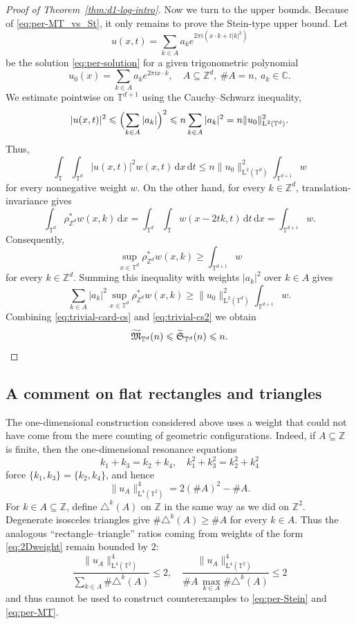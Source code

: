 \documentclass[11pt,reqno]{amsart}
\numberwithin{equation}{section}
\newcommand{\dd}{\,\mathrm{d}}
\renewcommand{\leq}{\leqslant}
\renewcommand{\geq}{\geqslant}
\renewcommand{\ge}{\geqslant}
\begin{document}
\begin{proof}[Proof of Theorem~\ref{thm:d1-log-intro}]
Now we turn to the upper bounds. Because of \eqref{eq:per-MT_vs_St}, it only remains to prove the Stein-type upper bound. 
Let
\[ u(x,t) = \sum_{k\in A} a_k e^{2\pi i (x\cdot k + t|k|^2)} \]
be the solution \eqref{eq:per-solution} for a given trigonometric polynomial
\[ u_0(x) = \sum_{k\in A} a_k e^{2\pi i x\cdot k},\quad A\subseteq\mathbb{Z}^d,\ \#A=n,\ a_k\in\mathbb{C}. \]
We estimate pointwise on $\mathbb{T}^{d+1}$ using the Cauchy--Schwarz inequality,
\[ |u(x,t)|^2 \leq \Bigl(\sum_{k\in A}|a_k|\Bigr)^2
\leq n\sum_{k\in A}|a_k|^2
= n\|u_0\|_{\mathrm{L}^2(\mathbb{T}^d)}^2. \]
Thus,
\begin{equation}\label{eq:trivial-card-cs}
\int_{\mathbb{T}} \int_{\mathbb{T}^d} |u(x,t)|^2w(x,t)\dd x\dd t \leq n\|u_0\|_{\mathrm{L}^2(\mathbb{T}^d)}^2 \int_{\mathbb{T}^{d+1}}w
\end{equation}
for every nonnegative weight $w$. On the other hand, for every $k\in\mathbb{Z}^d$, translation-invariance gives
\[ \int_{\mathbb{T}^d}\rho^{\ast}_{\mathbb{Z}^d}w(x,k)\dd x
= \int_{\mathbb{T}^d}\int_{\mathbb{T}} w(x-2tk,t)\dd t\dd x  
= \int_{\mathbb{T}^{d+1}} w. \]
Consequently,
\[ \sup_{x\in\mathbb{T}^d}\rho^{\ast}_{\mathbb{Z}^d}w(x,k) \geq \int_{\mathbb{T}^{d+1}}w \]
for every $k\in\mathbb{Z}^d$. Summing this inequality with weights $|a_k|^2$ over $k\in A$ gives
\begin{equation}\label{eq:trivial-cs2}
\sum_{k\in A}|a_k|^2 \sup_{x\in\mathbb{T}^d}\rho^{\ast}_{\mathbb{Z}^d}w(x,k)
\geq \|u_0\|_{\mathrm{L}^2(\mathbb{T}^d)}^2 \int_{\mathbb{T}^{d+1}}w.
\end{equation}
Combining \eqref{eq:trivial-card-cs} and \eqref{eq:trivial-cs2} we obtain
\[ \widetilde{\mathfrak{M}}_{\mathbb{T}^d}(n) \leq \widetilde{\mathfrak{S}}_{\mathbb{T}^d}(n) \leq n. \qedhere \]
\end{proof}

\subsection{A comment on flat rectangles and triangles}
The one-dimensional construction considered above uses a weight that could not have come from the mere counting of geometric configurations.
Indeed, if $A\subseteq\mathbb{Z}$ is finite, then the one-dimensional resonance equations
\[ k_1+k_3=k_2+k_4, \quad k_1^2+k_3^2=k_2^2+k_4^2 \]
force $\{k_1,k_3\}=\{k_2,k_4\}$, and hence
\[ \|u_A\|_{\mathrm{L}^4(\mathbb{T}^2)}^4=2(\#A)^2-\#A. \]
For $k\in A\subseteq\mathbb{Z}$, define $\triangle^k(A)$ on $\mathbb{Z}$ in the same way as we did on $\mathbb{Z}^2$.
Degenerate isosceles triangles give $\#\triangle^k(A)\ge\#A$ for every $k\in A$. Thus the analogous ``rectangle--triangle'' ratios coming from weights of the form \eqref{eq:2Dweight} remain bounded by $2$:
\[ \frac{\|u_A\|_{\mathrm{L}^4(\mathbb{T}^2)}^4}{\sum_{k\in A}\#\triangle^k(A)}\leq 2,
\quad \frac{\|u_A\|_{\mathrm{L}^4(\mathbb{T}^2)}^4}{\#A\, \max_{k\in A}\limits \#\triangle^k(A)}\leq 2 \]
and thus cannot be used to construct counterexamples to \eqref{eq:per-Stein} and \eqref{eq:per-MT}.
\end{document}
